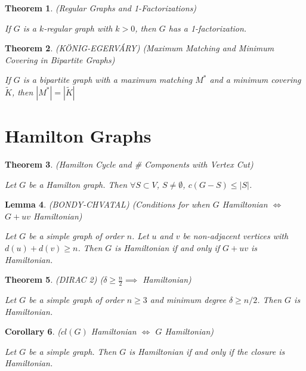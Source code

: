 \documentclass[12pt]{amsart}
\newtheorem{thm}{Theorem}
\newtheorem{lem}[thm]{Lemma}
\newtheorem{cor}[thm]{Corollary}
\theoremstyle{definition}
\begin{document}
\begin{thm} (Regular Graphs and 1-Factorizations)

If $G$ is a $k$-regular graph with $k > 0$, then $G$ has a 1-factorization.
\end{thm}


\begin{thm} (K\"{O}NIG-EGERV\'{A}RY) (Maximum Matching and Minimum Covering in Bipartite Graphs)

If $G$ is a bipartite graph with a maximum matching $M^*$ and a minimum covering $\widetilde{K}$, then $|M^*|=|\widetilde{K}|$
\end{thm}


\section{Hamilton Graphs}


\begin{thm} (Hamilton Cycle and \# Components with Vertex Cut)

Let $G$ be a Hamilton graph. Then $\forall S\subset V$, $S\neq \emptyset$, $c(G-S)\leq |S|$.
\end{thm}

\begin{lem} (BONDY-CHVATAL) (Conditions for when $G$ Hamiltonian $\Longleftrightarrow$ $G+uv$ Hamiltonian)

Let $G$ be a simple graph of order $n$. Let $u$ and $v$ be non-adjacent vertices with $d(u) + d(v) \geq n$. Then $G$ is Hamiltonian if and only if $G+uv$ is Hamiltonian.
\end{lem}


\begin{thm} (DIRAC 2) ($\delta\geq \frac{n}{2}\implies$ Hamiltonian)

Let $G$ be a simple graph of order $n \geq 3$ and minimum degree $\delta \geq n/2$. Then $G$ is Hamiltonian.
\end{thm}

\begin{cor} ($cl(G)$ Hamiltonian $\Longleftrightarrow$ $G$ Hamiltonian)

Let $G$ be a simple graph. Then $G$ is Hamiltonian if and only if the closure is Hamiltonian.
\end{cor}
\end{document}

